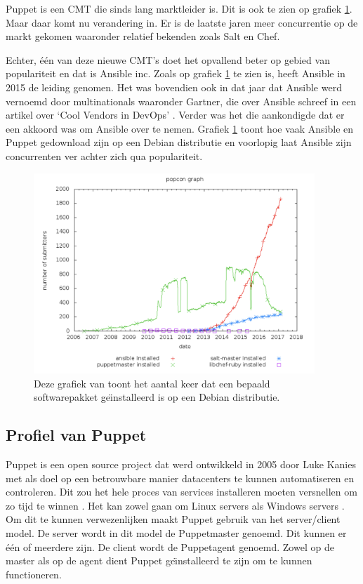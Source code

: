 Puppet is een \gls{CMT} die sinds lang marktleider is. Dit is ook te zien op grafiek \ref{fig:popcon_everybody}. Maar daar komt nu verandering in. Er is de laatste jaren meer concurrentie op de markt gekomen waaronder relatief bekenden zoals Salt en Chef. 

Echter, \'e\'en van deze nieuwe \gls{CMT}'s doet het opvallend beter op gebied van populariteit en dat is Ansible inc. Zoals op grafiek \ref{fig:popcon_everybody} te zien is, heeft Ansible in 2015 de leiding genomen. Het was bovendien ook in dat jaar dat Ansible werd vernoemd door multinationals waaronder Gartner, die over Ansible schreef in een artikel over ‘Cool Vendors in DevOps' \autocite{gartner}. Verder was het \textcite{redhatovername} die aankondigde dat er een akkoord was om Ansible over te nemen. Grafiek \ref{fig:popcon_everybody} toont hoe vaak Ansible en Puppet gedownload zijn op een Debian distributie en voorlopig laat Ansible zijn concurrenten ver achter zich qua populariteit. \newline

\begin{figure}
	\includegraphics[width=400px]{img/popcon_everybody.png}
	\caption{Deze grafiek van \textcite{popcon} toont het aantal keer dat een bepaald softwarepakket ge\"{\i}nstalleerd is op een Debian distributie. }
	\label{fig:popcon_everybody}
\end{figure}

\subsection{Profiel van Puppet}
Puppet is een open source project dat werd ontwikkeld in 2005 door Luke Kanies \autocite{PuppetLeaders} met als doel op een betrouwbare manier datacenters te kunnen automatiseren en controleren. Dit zou het hele proces van services installeren moeten versnellen om zo tijd te winnen \autocite{how-puppet-works}. Het kan zowel gaan om Linux servers als Windows servers \autocite{PuppetForWindows}. Om dit te kunnen verwezenlijken maakt Puppet gebruik van het server/client model. De server wordt in dit model de Puppetmaster genoemd. Dit kunnen er \'e\'en of meerdere zijn.  De client wordt de Puppetagent genoemd. Zowel op de master als op de agent dient Puppet ge{\"\i}nstalleerd te zijn om te kunnen functioneren. \autocite{puppetdoc} \autocite{puppetfaq}


